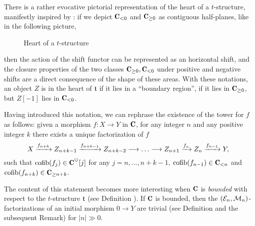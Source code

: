 \begin{remark}\label{evocative}
There is a rather evocative pictorial representation of the heart of a $t$-structure, manifestly inspired by \cite{Brid}:
 if we depict $\C_{<0}$ and $\C_{\geq 0}$ as contiguous half-planes, like in the following picture,
\begin{center}
\begin{figure}[h]
\caption{Heart of a $t$-structure}
\end{figure}
\end{center}
then the action of the shift functor can be represented as an horizontal shift, and the closure properties of the two classes $\C_{\geq 0},\C_{<0}$ under positive and negative shifts are a direct consequence of the shape of these areas. With these notations, an object $Z$ is in the heart of $\mathfrak{t}$ if it lies in a ``boundary region'', \ie if it lies in $\C_{\geq 0}$, but $Z[-1]$ lies in $\C_{<0}$.
\end{remark}
Having introduced this notation, we can rephrase the existence of the tower for $f$ as follows: given a morphism  $f\colon X\to Y$  in $\C$, for any integer $n$ and any positive integer $k$ there exists a unique factorization of $f$ 
\[
X \xto{f_{n+k}} Z_{n+k-1} \xto{f_{n+k-1}}Z_{n+k-2}\to\dots\to Z_{n+1} \xto{f_{n}} Z_{n} \xto{f_{n-1}} Y,
\]
such that
$\cofib(f_j)\in \C^\heart[j]$ for any $j=n,\dots,n+k-1$,  $\cofib(f_{n-1})\in \C_{<n}$  and $\cofib(f_{n+k})\in \C_{\geq n+k}$. 


The content of this statement becomes more interesting when $\C$ is \emph{bounded} with respect to the $t$-structure $\mathfrak{t}$ (see Definition ). If $\C$ is bounded, then the $(\mathcal{E}_n,\mathcal{M}_n)$-factorizations of an initial morphism $0\to Y$ are trivial (see Definition  and the subsequent Remark) for $|n|\gg 0$. 

